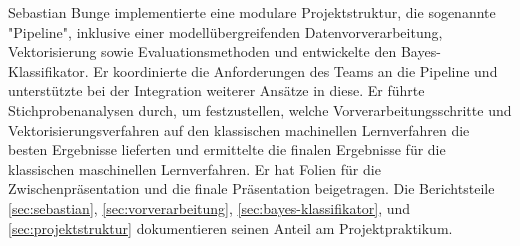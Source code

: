 \label{sec:sebastian}
Sebastian Bunge implementierte eine modulare Projektstruktur, die sogenannte "Pipeline", inklusive einer modellübergreifenden Datenvorverarbeitung, Vektorisierung sowie Evaluationsmethoden und entwickelte den Bayes-Klassifikator. Er koordinierte die Anforderungen des Teams an die Pipeline und unterstützte bei der Integration weiterer Ansätze in diese. Er führte Stichprobenanalysen durch, um festzustellen, welche Vorverarbeitungsschritte und Vektorisierungsverfahren auf den klassischen machinellen Lernverfahren die besten Ergebnisse lieferten und ermittelte die finalen Ergebnisse für die klassischen maschinellen Lernverfahren. Er hat Folien für die Zwischenpräsentation und die finale Präsentation beigetragen. Die Berichtsteile \ref{sec:sebastian}, \ref{sec:vorverarbeitung}, \ref{sec:bayes-klassifikator}, und \ref{sec:projektstruktur} dokumentieren seinen Anteil am Projektpraktikum.
